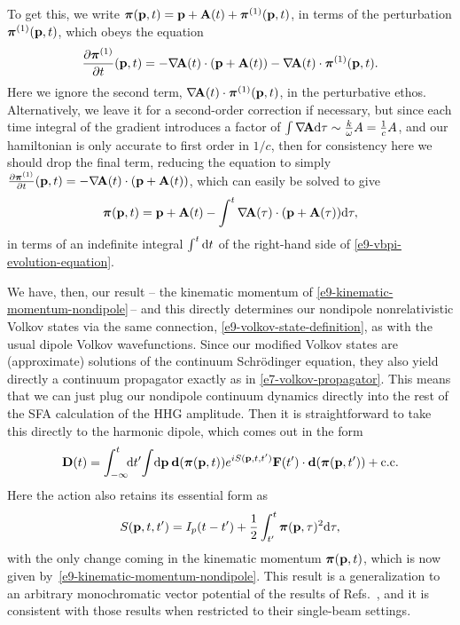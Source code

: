 To get this, we write $\boldsymbol{\pi}(\vb{p},t) = \vb{p} + \vb{A}(t) +\boldsymbol{\pi}^{(1)}(\vb{p},t)$, in terms of the perturbation $\boldsymbol{\pi}^{(1)}(\vb{p},t)$, which obeys the equation
\begin{equation}
\frac{\partial\boldsymbol{\pi}^{(1)}}{\partial t}(\vb{p},t)
=
-\nabla\!\vb{A}(t)\cdot \left(\vb{p} + \vb{A}(t) \right)
-\nabla\!\vb{A}(t)\cdot \boldsymbol{\pi}^{(1)}(\vb{p},t)
.
\end{equation}
Here we ignore the second term, $\nabla\!\vb{A}(t)\cdot \boldsymbol{\pi}^{(1)}(\vb{p},t)$, in the perturbative ethos. Alternatively, we leave it for a second-order correction if necessary, but since each time integral of the gradient introduces a factor of $\int\nabla\!\vb{A}\mathrm{d}\tau \sim \frac{k}{\omega}A= \frac{1}{c}A$, and our hamiltonian is only accurate to first order in $1/c$, then for consistency here we should drop the final term, reducing the equation to simply $\frac{\partial\boldsymbol{\pi}^{(1)}}{\partial t}(\vb{p},t) = -\nabla\!\vb{A}(t)\cdot \left(\vb{p} + \vb{A}(t) \right)$, which can easily be solved to give
\begin{equation}
\boldsymbol{\pi}(\vb{p},t)=\vb{p}+\vb{A}(t)-\int^t\nabla\!\vb{A}(\tau) \cdot (\vb{p}+\vb{A}(\tau))\mathrm{d}\tau,
\label{e9-kinematic-momentum-nondipole}
\end{equation}
in terms of an indefinite integral $\int^t\mathrm{d} t$ of the right-hand side of \eqref{e9-vbpi-evolution-equation}. 


We have, then, our result -- the kinematic momentum of \eqref{e9-kinematic-momentum-nondipole}\,-- and this directly determines our nondipole nonrelativistic Volkov states via the same connection, \eqref{e9-volkov-state-definition}, as with the usual dipole Volkov wavefunctions. Since our modified Volkov states are (approximate) solutions of the continuum Schrödinger equation, they also yield directly a continuum propagator exactly as in \eqref{e7-volkov-propagator}. This means that we can just plug our nondipole continuum dynamics directly into the rest of the SFA calculation of the HHG amplitude. Then it is straightforward to take this directly to the harmonic dipole, which comes out in the form
\begin{equation}
\vb D(t)
=
\int_{-\infty}^t \!\!\mathrm{d} t'\!
\int\!\mathrm{d}\vb{p}\:
\vb{d}(\boldsymbol{\pi}(\vb{p},t))
e^{iS(\vb{p},t,t')}
\vb{F}(t')\cdot\vb{d}(\boldsymbol{\pi}(\vb{p},t'))
+\mathrm{c.c.}
\label{e9-initial-harmonic-dipole}
\end{equation}
Here the action also retains its essential form as
\begin{equation}
S(\vb{p},t,t')=I_p(t-t')+\frac12 \int_{t'}^t \boldsymbol{\pi}(\vb{p},\tau)^2\mathrm{d}\tau
,
\label{e9-initial-action}
\end{equation}
with the only change coming in the kinematic momentum $\boldsymbol{\pi}(\vb{p},t)$, which is now given by~\eqref{e9-kinematic-momentum-nondipole}. This result is a generalization to an arbitrary monochromatic vector potential of the results of Refs.~\citealp{ kylstra_photon_2001, kylstra_photon_2002, chirila_analysis_2004, chirila_nondipole_2002}, and it is consistent with those results when restricted to their single-beam settings.




